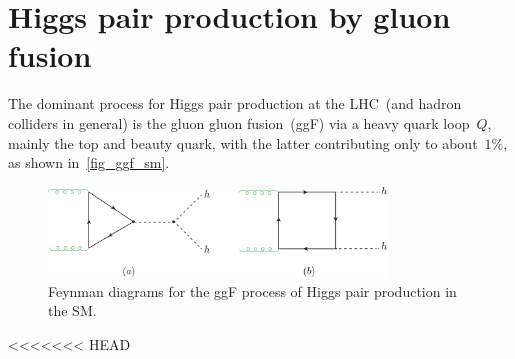 \section{Higgs pair production by gluon fusion \label{ggFhh}  }
The dominant process for Higgs pair production at the LHC~(and hadron colliders in general) is the gluon gluon fusion~(ggF) via a heavy quark loop~$Q$, mainly the top and beauty quark, with the latter contributing only to about~$1\%$, as shown in~\autoref{fig_ggf_sm}.
%
\begin{figure}[!htpb]
	\centering
	\includegraphics[width = 0.8\textwidth]{./figures/di-higgs-LO-SM}
	\caption{Feynman diagrams for the ggF process of Higgs pair production in the SM.} 
	\label{fig_ggf_sm}
\end{figure}
%
<<<<<<< HEAD

